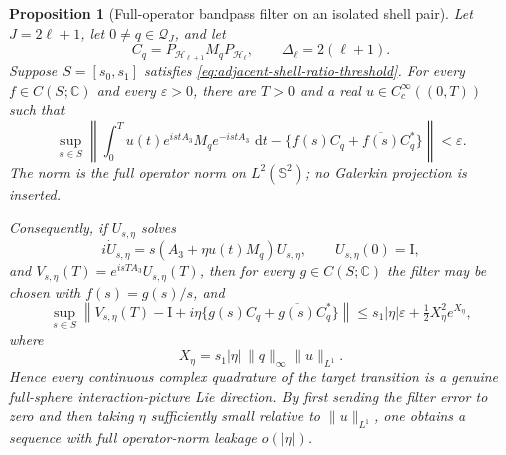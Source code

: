 \documentclass[11pt]{article}
\newtheorem{proposition}[theorem]{Proposition}
\theoremstyle{remark}
\newcommand{\Id}{\mathrm I}
\newcommand{\dd}{\,\mathrm d}
\begin{document}
\begin{proposition}[Full-operator bandpass filter on an isolated shell pair]
\label{prop:isolated-shell-bandpass-filter}
Let $J=2\ell+1$, let $0\neq q\in\mathcal Q_J$, and let
\[
 C_q=P_{\mathcal H_{\ell+1}}M_qP_{\mathcal H_\ell},
 \qquad
 \Delta_\ell=2(\ell+1).
\]
Suppose $S=[s_0,s_1]$ satisfies
\eqref{eq:adjacent-shell-ratio-threshold}.  For every
$f\in C(S;\mathbb C)$ and every $\varepsilon>0$, there are $T>0$ and a real
$u\in C_c^\infty((0,T))$ such that
\begin{equation}
 \sup_{s\in S}
 \left\|
  \int_0^T
   u(t)e^{istA_3}M_qe^{-istA_3}\,\dd t
  -
  \{f(s)C_q+\overline{f(s)}C_q^\ast\}
 \right\|
 <\varepsilon.
 \label{eq:full-operator-bandpass-filter}
\end{equation}
The norm is the full operator norm on $L^2(\mathbb S^2)$; no Galerkin
projection is inserted.

Consequently, if $U_{s,\eta}$ solves
\[
 i\dot U_{s,\eta}
 =s(A_3+\eta u(t)M_q)U_{s,\eta},
 \qquad U_{s,\eta}(0)=\Id,
\]
and $V_{s,\eta}(T)=e^{isTA_3}U_{s,\eta}(T)$, then for every
$g\in C(S;\mathbb C)$ the filter may be chosen with $f(s)=g(s)/s$, and
\begin{equation}
 \sup_{s\in S}
 \left\|
  V_{s,\eta}(T)
  -\Id
  +i\eta\{g(s)C_q+\overline{g(s)}C_q^\ast\}
 \right\|
 \leq
 s_1|\eta|\varepsilon+\tfrac12X_\eta^2e^{X_\eta},
 \label{eq:full-operator-small-filtered-gate}
\end{equation}
where
\[
 X_\eta=s_1|\eta|\,\|q\|_\infty\|u\|_{L^1}.
\]
Hence every continuous complex quadrature of the target transition is a
genuine full-sphere interaction-picture Lie direction.  By first sending the
filter error to zero and then taking $\eta$ sufficiently small relative to
$\|u\|_{L^1}$, one obtains a sequence with full operator-norm leakage
$o(|\eta|)$.
\end{proposition}
\end{document}
